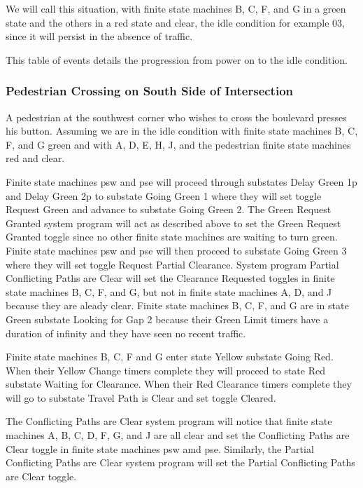 \documentclass[letterpaper,twoside]{article}
\begin{document}
We will call this situation, with finite state machines B, C, F, and G
in a green state and the others in a red state and clear, the idle condition
for example 03, since it will persist in the absence of traffic.

This table of events details the progression from power on to the idle
condition.



\subsubsection{Pedestrian Crossing on South Side of Intersection}
A pedestrian at the southwest corner who wishes to cross the boulevard
presses his button.  Assuming we are in the idle condition
with finite state machines B, C, F, and G green and with A, D, E, H, J,
and the pedestrian finite state machines red and clear.

Finite state machines psw and pse will proceed through substates
Delay Green 1p and Delay Green 2p to substate
Going Green 1 where they will set toggle Request Green and
advance to substate Going Green 2.
The Green Request Granted system program will act
as described above to set the Green Request Granted toggle since no other
finite state machines are waiting to turn green.
Finite state machines psw and pse will then
proceed to substate Going Green 3 where they will set toggle Request Partial
Clearance.  System program Partial Conflicting Paths are Clear will set
the Clearance Requested toggles in finite state machines B, C, F, and G,
but not in finite state machines A, D, and J because they are aleady clear.
Finite state machines B, C, F, and G are in state Green substate
Looking for Gap 2 because their Green Limit timers have a
duration of infinity and they have seen no recent traffic.

Finite state machines B, C, F and G enter state Yellow substate Going Red.
When their Yellow Change timers complete they will proceed to state Red
substate Waiting for Clearance.
When their Red Clearance timers complete they will go
to substate Travel Path is Clear and set toggle Cleared.

The Conflicting Paths are Clear system program will notice that
finite state machines A, B, C, D, F, G, and J are all clear and set the
Conflicting Paths are Clear toggle in finite state machines psw amd pse.
Similarly, the Partial Conflicting Paths are Clear system program will set the
Partial Conflicting Paths are Clear toggle.
\end{document}
